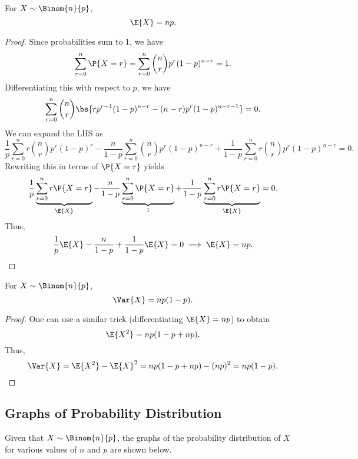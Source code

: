 \begin{proposition}
    For $X \sim \Binom{n}{p}$, \[\E{X} = np.\]
\end{proposition}
\begin{proof}
    Since probabilities sum to 1, we have \[\sum_{r = 0}^n \P{X = r} = \sum_{r = 0}^n \binom{n}{r} p^r (1-p)^{n-r} = 1.\] Differentiating this with respect to $p$, we have \[\sum_{r = 0}^n \binom{n}{r} \bs{r p^{r-1} (1-p)^{n-r} - (n-r) p^r (1-p)^{n-r-1}} = 0.\] We can expand the LHS as \[\frac1p \sum_{r = 0}^n r \binom{n}{r} p^{r} (1-p)^r - \frac{n}{1-p} \sum_{r = 0}^n \binom{n}{r} p^r (1-p)^{n-r} + \frac{1}{1-p} \sum_{r = 0}^n r \binom{n}{r} p^r (1-p)^{n-r} = 0.\] Rewriting this in terms of $\P{X = r}$ yields \[\frac1p \underbrace{\sum_{r = 0}^n r \P{X = r}}_{\E{X}} - \frac{n}{1-p} \underbrace{\sum_{r =0}^n \P{X = r}}_{1} + \frac1{1-p} \underbrace{\sum_{r = 0}^n r \P{X = r}}_{\E{X}} = 0.\] Thus, \[\frac1p \E{X} - \frac{n}{1-p} + \frac1{1-p} \E{X} = 0 \implies \E{X} = np.\]
\end{proof}

\begin{proposition}
    For $X \sim \Binom{n}{p}$, \[\Var{X} = np(1-p).\]
\end{proposition}
\begin{proof}
    One can use a similar trick (differentiating $\E{X} = np$) to obtain \[\E{X^2} = np(1 - p + np).\] Thus, \[\Var{X} = \E{X^2} - \E{X}^2 = np(1 - p + np) - (np)^2 = np(1-p).\]
\end{proof}

\subsection{Graphs of Probability Distribution}

Given that $X \sim \Binom{n}{p}$, the graphs of the probability distribution of $X$ for various values of $n$ and $p$ are shown below.

